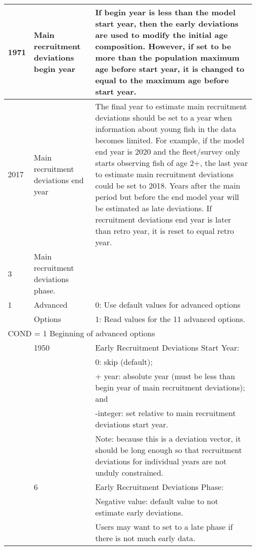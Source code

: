 \begin{longtable}{p{1cm} p{3cm} p{12cm}}
	1971 \Tstrut & Main recruitment deviations begin year & If begin year is less than the model start year, then the early deviations are used to modify the initial age composition. However, if set to be more than the population maximum age before start year, it is changed to equal to the maximum age before start year. \Bstrut\\
	\hline

	2017 \Tstrut & \hypertarget{RecDevEndYear}{Main recruitment deviations end year} & The final year to estimate main recruitment deviations should be set to a year when information about young fish in the data becomes limited. For example, if the model end year is 2020 and the fleet/survey only starts observing fish of age 2+, the last year to estimate main recruitment deviations could be set to 2018. Years after the main period but before the end model year will be estimated as late deviations. If recruitment deviations end year is later than retro year, it is reset to equal retro year. \Bstrut\\
	\hline

	3 \Tstrut & Main recruitment deviations phase. & \Bstrut\\
	\hline

	1 \Tstrut & Advanced & 0: Use default values for advanced options \\ 
	& Options & 1: Read values for the 11 advanced options. \Bstrut\\
	\hline

	\multicolumn{3}{l}{COND = 1 Beginning of advanced options} \Tstrut\Bstrut\\
	& 1950 & Early Recruitment Deviations Start Year: \\
	& & 0: skip (default); \\
	& & + year: absolute year (must be less than begin year of main recruitment deviations); and \\
	& & -integer: set relative to main recruitment deviations start year. \\
	& & Note: because this is a deviation vector, it should be long enough so that recruitment deviations for individual years are not unduly constrained. \\

	\Tstrut & 6 & Early Recruitment Deviations Phase: \\
	& & Negative value: default value to not estimate early deviations. \\
	& & Users may want to set to a late phase if there is not much early data. \\
	

\end{longtable}

